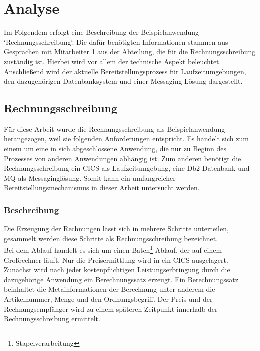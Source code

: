 \chapter{Analyse}\label{ch:analyse}
Im Folgendem erfolgt eine Beschreibung der Beispielanwendung `Rechnungsschreibung`.
Die dafür benötigten Informationen stammen aus Gesprächen mit Mitarbeiter 1 aus der Abteilung, die für die Rechnungsschreibung zuständig ist.
Hierbei wird vor allem der technische Aspekt beleuchtet.
Anschließend wird der aktuelle Bereitstellungsprozess für Laufzeitumgebungen, den dazugehörigen Datenbanksystem und einer Messaging Lösung dargestellt.

\section{Rechnungsschreibung}
Für diese Arbeit wurde die Rechnungsschreibung als Beispielanwendung herangezogen, weil sie folgenden Anforderungen entspricht.
Es handelt sich zum einem um eine in sich abgeschlossene Anwendung, die nur zu Beginn des Prozesses von anderen Anwendungen abhängig ist.
Zum anderen benötigt die Rechnungsschreibung ein CICS als Laufzeitumgebung, eine Db2-Datenbank und MQ als Messaginglösung.
Somit kann ein umfangreicher Bereitstellungsmechanismus in dieser Arbeit untersucht werden.

\subsection{Beschreibung}\label{rechBesch}
Die Erzeugung der Rechnungen lässt sich in mehrere Schritte unterteilen, gesammelt werden diese Schritte als Rechnungsschreibung bezeichnet.\\
Bei dem Ablauf handelt es sich um einen Batch\footnote{Stapelverarbeitung}-Ablauf, der auf einem Großrechner läuft.
Nur die Preisermittlung wird in ein CICS ausgelagert.
Zunächst wird nach jeder kostenpflichtigen Leistungserbringung durch die dazugehörige Anwendung ein Berechnungssatz erzeugt.
Ein Berechnungssatz beinhaltet die Metainformationen der Berechnung unter anderem die Artikelnummer, Menge und den Ordnungsbegriff.
Der Preis und der Rechnungsempfänger wird zu einem späteren Zeitpunkt innerhalb der Rechnungsschreibung ermittelt.

